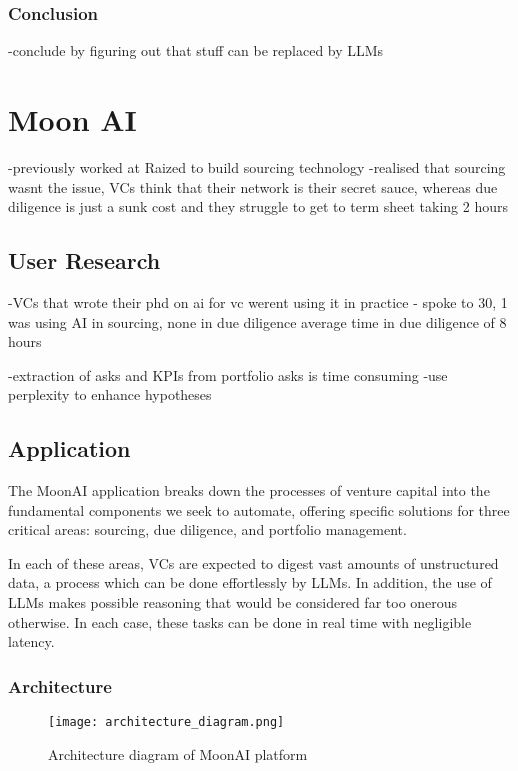 \documentclass[a4paper, oneside]{discothesis}
\begin{document}
\subsection{Conclusion}
-conclude by figuring out that stuff can be replaced by LLMs

\chapter{Moon AI}
-previously worked at Raized to build sourcing technology 
-realised that sourcing wasnt the issue, VCs think that their network is their secret sauce, whereas due diligence is just a sunk cost and they struggle to get to term sheet taking 2 hours
\section{User Research}
-VCs that wrote their phd on ai for vc werent using it in practice 
-
spoke to 30, 1 was using AI in sourcing, none in due diligence
average time in due diligence of 8 hours 

-extraction of asks and KPIs from portfolio asks is time consuming
-use perplexity to enhance hypotheses

\section{Application}

The MoonAI application breaks down the processes of venture capital into the fundamental components we seek to automate, offering specific solutions for three critical areas: sourcing, due diligence, and portfolio management.

In each of these areas, VCs are expected to digest vast amounts of unstructured data, a process which can be done effortlessly by LLMs. In addition, the use of LLMs makes possible reasoning that would be considered far too onerous otherwise. In each case, these tasks can be done in real time with negligible latency.

\subsection{Architecture}
\begin{figure}[h]
    \centering
    \texttt{[image: architecture\_diagram.png]}
    \caption{Architecture diagram of MoonAI platform}
    \label{fig:architecture}
\end{figure}
\end{document}
